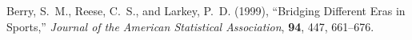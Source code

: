 \documentclass[11pt]{article}\usepackage[]{graphicx}\usepackage[]{color}
\begin{document}
\begin{FlushLeft}
\begin{thebibliography}{00}
\singlespacing






Berry, S.~M., Reese, C.~S., and Larkey, P.~D. (1999),
\newblock ``Bridging Different Eras in Sports,''
\newblock \emph{Journal of the American Statistical Association}, {\bf 94}, 447, 661--676.





\end{thebibliography}
\end{FlushLeft}
\end{document}
